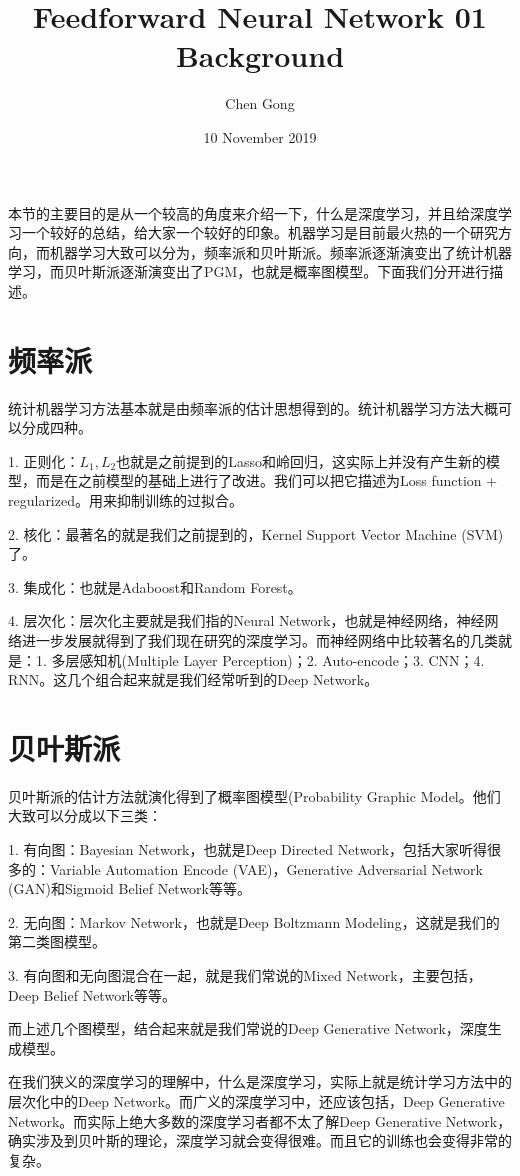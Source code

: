 \documentclass[a4paper]{article}
\title{Feedforward Neural Network 01 Background}
\author{Chen Gong}
\date{10 November 2019}
\begin{document}
\maketitle

本节的主要目的是从一个较高的角度来介绍一下，什么是深度学习，并且给深度学习一个较好的总结，给大家一个较好的印象。机器学习是目前最火热的一个研究方向，而机器学习大致可以分为，频率派和贝叶斯派。频率派逐渐演变出了统计机器学习，而贝叶斯派逐渐演变出了PGM，也就是概率图模型。下面我们分开进行描述。

\section{频率派}
统计机器学习方法基本就是由频率派的估计思想得到的。统计机器学习方法大概可以分成四种。

1. 正则化：$L_1,L_2$也就是之前提到的Lasso和岭回归，这实际上并没有产生新的模型，而是在之前模型的基础上进行了改进。我们可以把它描述为Loss function + regularized。用来抑制训练的过拟合。

2. 核化：最著名的就是我们之前提到的，Kernel Support Vector Machine (SVM)了。

3. 集成化：也就是Adaboost和Random Forest。

4. 层次化：层次化主要就是我们指的Neural Network，也就是神经网络，神经网络进一步发展就得到了我们现在研究的深度学习。而神经网络中比较著名的几类就是：1. 多层感知机(Multiple Layer Perception)；2. Auto-encode；3. CNN；4. RNN。这几个组合起来就是我们经常听到的Deep Network。

\section{贝叶斯派}
贝叶斯派的估计方法就演化得到了概率图模型(Probability Graphic Model。他们大致可以分成以下三类：

1. 有向图：Bayesian Network，也就是Deep Directed Network，包括大家听得很多的：Variable Automation Encode (VAE)，Generative Adversarial Network (GAN)和Sigmoid Belief Network等等。

2. 无向图：Markov Network，也就是Deep Boltzmann Modeling，这就是我们的第二类图模型。

3. 有向图和无向图混合在一起，就是我们常说的Mixed Network，主要包括，Deep Belief Network等等。

而上述几个图模型，结合起来就是我们常说的Deep Generative Network，深度生成模型。

在我们狭义的深度学习的理解中，什么是深度学习，实际上就是统计学习方法中的层次化中的Deep Network。而广义的深度学习中，还应该包括，Deep Generative Network。而实际上绝大多数的深度学习者都不太了解Deep Generative Network，确实涉及到贝叶斯的理论，深度学习就会变得很难。而且它的训练也会变得非常的复杂。
\end{document}
